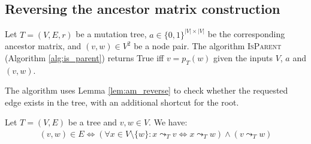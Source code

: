 \subsection{Reversing the ancestor matrix construction}

\begin{theorem}
    \label{theo:am_reverse}
    Let $T=(V, E, r)$ be a mutation tree, $a \in \{0, 1\}^{|V| \times |V|}$ be the corresponding ancestor matrix, and $(v, w) \in V^2$ be a node pair. The algorithm \textsc{IsParent} (Algorithm \ref{alg:is_parent}) returns True iff $v = p_T(w)$ given the inputs $V$, $a$ and $(v,w)$.
\end{theorem}

The algorithm uses Lemma \ref{lem:am_reverse} to check whether the requested edge exists in the tree, with an additional shortcut for the root.

\begin{lemma}
    \label{lem:am_reverse}
    Let $T = (V, E)$ be a tree and $v, w \in V$. We have:
    \begin{align*}
        (v, w) \in E \Leftrightarrow (\forall x \in V \setminus \{w\}: x \leadsto_T v \Leftrightarrow x \leadsto_T w) \wedge (v \leadsto_T w)
    \end{align*}
\end{lemma}

